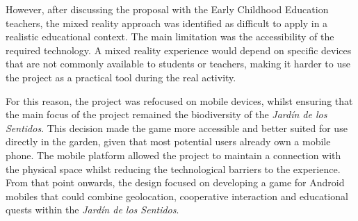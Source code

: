 However, after discussing the proposal with the Early Childhood Education teachers, the mixed reality approach was identified as difficult to apply in a realistic educational context. The main limitation was the accessibility of the required technology. A mixed reality experience would depend on specific devices that are not commonly available to students or teachers, making it harder to use the project as a practical tool during the real activity.

For this reason, the project was refocused on mobile devices, whilst ensuring that the main focus of the project remained the biodiversity of the \textit{Jardín de los Sentidos}. This decision made the game more accessible and better suited for use directly in the garden, given that most potential users already own a mobile phone. The mobile platform allowed the project to maintain a connection with the physical space whilst reducing the technological barriers to the experience. From that point onwards, the design focused on developing a game for Android mobiles that could combine geolocation, cooperative interaction and educational quests within the \textit{Jardín de los Sentidos}.

